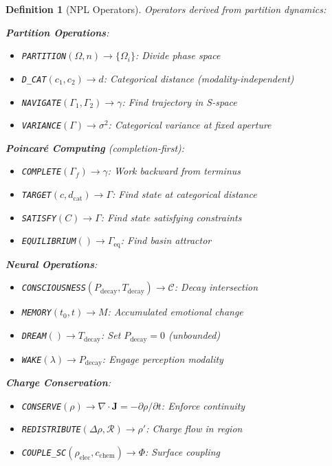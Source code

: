 \documentclass[aps,prd,twocolumn,superscriptaddress,floatfix,nofootinbib]{revtex4-2}
\newtheorem{definition}[theorem]{Definition}
\theoremstyle{remark}
\newcommand{\Ccat}{\mathcal{C}}
\newcommand{\Gstate}{\Gamma}
\newcommand{\Pdecay}{P_{\mathrm{decay}}}
\newcommand{\Tdecay}{T_{\mathrm{decay}}}
\begin{document}
\begin{definition}[NPL Operators]
\label{def:npl_operators}
Operators derived from partition dynamics:

\textbf{Partition Operations}:
\begin{itemize}
\item \texttt{PARTITION}$(\Omega, n) \to \{\Omega_i\}$: Divide phase space
\item \texttt{D\_CAT}$(c_1, c_2) \to d$: Categorical distance (modality-independent)
\item \texttt{NAVIGATE}$(\Gstate_1, \Gstate_2) \to \gamma$: Find trajectory in S-space
\item \texttt{VARIANCE}$(\Gstate) \to \sigma^2$: Categorical variance at fixed aperture
\end{itemize}

\textbf{Poincar\'{e} Computing} (completion-first):
\begin{itemize}
\item \texttt{COMPLETE}$(\Gstate_f) \to \gamma$: Work backward from terminus
\item \texttt{TARGET}$(c, d_{\text{cat}}) \to \Gstate$: Find state at categorical distance
\item \texttt{SATISFY}$(C) \to \Gstate$: Find state satisfying constraints
\item \texttt{EQUILIBRIUM}$() \to \Gstate_{\text{eq}}$: Find basin attractor
\end{itemize}

\textbf{Neural Operations}:
\begin{itemize}
\item \texttt{CONSCIOUSNESS}$(\Pdecay, \Tdecay) \to \Ccat$: Decay intersection
\item \texttt{MEMORY}$(t_0, t) \to M$: Accumulated emotional change
\item \texttt{DREAM}$() \to \Tdecay$: Set $\Pdecay = 0$ (unbounded)
\item \texttt{WAKE}$(\lambda) \to \Pdecay$: Engage perception modality
\end{itemize}

\textbf{Charge Conservation}:
\begin{itemize}
\item \texttt{CONSERVE}$(\rho) \to \nabla \cdot \mathbf{J} = -\partial\rho/\partial t$: Enforce continuity
\item \texttt{REDISTRIBUTE}$(\Delta\rho, \mathcal{R}) \to \rho'$: Charge flow in region
\item \texttt{COUPLE\_SC}$(\rho_{\text{elec}}, c_{\text{chem}}) \to \Phi$: Surface coupling
\end{itemize}
\end{definition}
\end{document}
